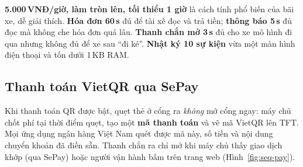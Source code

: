 \begin{lydo}
\textbf{5.000\,VNĐ/giờ, làm tròn lên, tối thiểu 1 giờ} là cách tính phổ biến của bãi
xe, dễ giải thích. \textbf{Hóa đơn 60\,s} đủ để tài xế đọc và trả tiền; \textbf{thông
báo 5\,s} đủ đọc mà không che hóa đơn quá lâu. \textbf{Thanh chắn mở 3\,s} đủ cho xe mô
hình đi qua nhưng không đủ để xe sau ``đi ké''. \textbf{Nhật ký 10 sự kiện} vừa một màn
hình điện thoại và tốn dưới 1\,KB RAM.
\end{lydo}

\subsection{Thanh toán VietQR qua SePay}\label{sec:vietqr}
Khi thanh toán QR được bật, quẹt thẻ ở cổng ra \emph{không} mở cổng ngay: máy chủ chốt
phí tại thời điểm quẹt, tạo một \textbf{mã thanh toán} và vẽ mã VietQR lên TFT. Mọi ứng
dụng ngân hàng Việt Nam quét được mã này, số tiền và nội dung chuyển khoản đã điền sẵn.
Thanh chắn ra chỉ mở khi máy chủ thấy giao dịch khớp (qua SePay) hoặc người vận hành bấm
 trên trang web (Hình~\ref{fig:seq-pay}).

